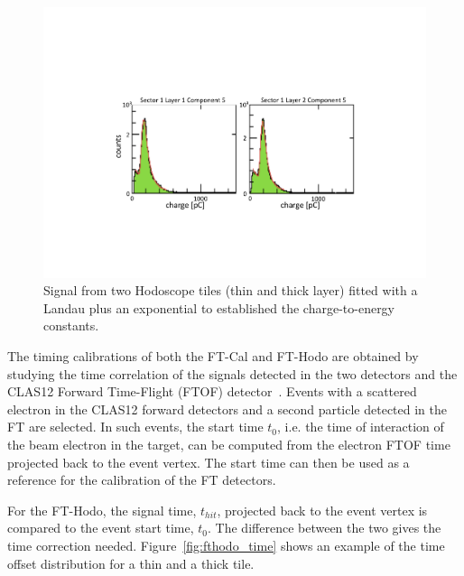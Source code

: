 \begin{figure}
\includegraphics[width=1.0\columnwidth]{fig/fthodo_mips.pdf}
\caption{Signal from two Hodoscope tiles (thin and thick layer) fitted with a Landau plus an exponential to established
  the charge-to-energy constants.}
\label{fig:fthodo_mips}
\end{figure}

The timing calibrations of both the FT-Cal and FT-Hodo are obtained by studying the time correlation of the signals
detected in the two detectors and the CLAS12 Forward Time-Flight (FTOF) detector~\cite{ftof}. Events with a
scattered electron in the CLAS12 forward detectors and a second particle detected in the FT are selected. In
such events, the start time $t_0$, i.e. the time of interaction of the beam electron in the target, can be computed
from the electron FTOF time projected back to the event vertex. The start time can then be used as a reference
for the calibration of the FT detectors. 

For the FT-Hodo, the signal time, $t_{hit}$, projected back to the event vertex is compared to the event start time,
$t_0$. The difference between the two gives the time correction needed. Figure~\ref{fig:fthodo_time} shows an
example of the time offset distribution for a thin and a thick tile.

